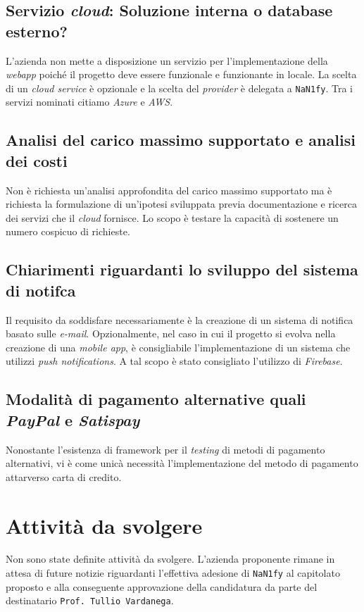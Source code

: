 \subsection{Servizio \textit{cloud}: Soluzione interna o database esterno?}
    L'azienda non mette a disposizione un servizio per l'implementazione della \textit{webapp} poiché il progetto deve essere funzionale e funzionante in locale. La scelta di un \textit{cloud service} è opzionale e la scelta del \textit{provider} è delegata a \texttt{NaN1fy}. Tra i servizi nominati citiamo \textit{Azure} e \textit{AWS}.
\subsection{Analisi del carico massimo supportato e analisi dei costi}
    Non è richiesta un'analisi approfondita del carico massimo supportato ma è richiesta la formulazione di un'ipotesi sviluppata previa documentazione e ricerca dei servizi che il \textit{cloud} fornisce.
    Lo scopo è testare la capacità di sostenere un numero cospicuo di richieste.
\subsection{Chiarimenti riguardanti lo sviluppo del sistema di notifca}
    Il requisito da soddisfare necessariamente è la creazione di un sistema di notifica basato sulle \textit{e-mail}. Opzionalmente, nel caso in cui il progetto si evolva nella creazione di una \textit{mobile app}, è consigliabile l'implementazione di un sistema che utilizzi \textit{push notifications}. A tal scopo è stato consigliato l'utilizzo di \textit{Firebase}.
\subsection{Modalità di pagamento alternative quali \textit{PayPal} e \textit{Satispay}}
    Nonostante l'esistenza di framework per il \textit{testing} di metodi di pagamento alternativi, vi è come unicà necessità l'implementazione del metodo di pagamento attarverso carta di credito.
\section{Attività da svolgere}
    Non sono state definite attività da svolgere. L'azienda proponente rimane in attesa di future notizie riguardanti l'effettiva adesione di \texttt{NaN1fy} al capitolato proposto e alla conseguente approvazione della candidatura da parte del destinatario \texttt{Prof. Tullio Vardanega}.
\\\\
